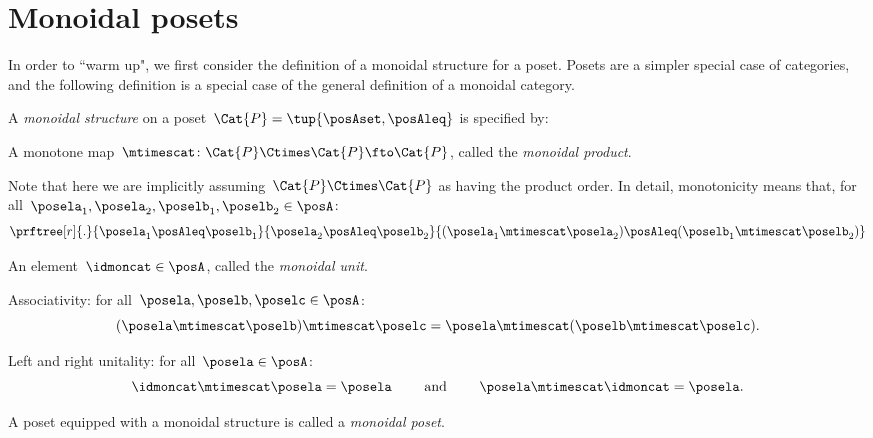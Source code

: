 
\section{Monoidal posets}


In order to ``warm up", we first consider the definition of a monoidal structure for a poset.
Posets are a simpler special case of categories, and the following definition is a special case of the general definition of a monoidal category.

\begin{ctdefinition}
    \label{def:monoidal-poset}
    A \emph{monoidal structure} on a poset~$\Cat{P} = \tup{\posAset, \posAleq}$ is specified by:

    \constit
    \begin{compactenum}
        \item A monotone map~$\mtimescat \colon \Cat{P} \Ctimes \Cat{P} \fto \Cat{P}$, called the \emph{monoidal product}.

              \noindent
              Note that here we are implicitly assuming~$\Cat{P} \Ctimes \Cat{P}$ as having the product order.
              In detail, monotonicity means that, for all~$\posela_1, \posela_2, \poselb_1, \poselb_2 \in \posA$:
              \begin{equation}
                  \prftree[r]{.
                  }
                  {\posela_1 \posAleq \poselb_1}{\posela_2 \posAleq \poselb_2}{ (\posela_1 \mtimescat  \posela_2) \posAleq  (\poselb_1 \mtimescat  \poselb_2)}
              \end{equation}
        \item An element~$\idmoncat \in \posA$, called the \emph{monoidal unit}.
    \end{compactenum}

    \condit
    \begin{compactenum}
        \item Associativity: for all~$\posela, \poselb, \poselc \in \posA$:
              \begin{equation}
                  (\posela \mtimescat \poselb)
                  \mtimescat \poselc =  \posela  \mtimescat ( \poselb \mtimescat \poselc).
              \end{equation}
        \item Left and right unitality: for all~$\posela \in \posA$:
              \begin{equation}
                  \idmoncat \mtimescat \posela = \posela \quad \quad \text{ and } \quad \quad \posela \mtimescat \idmoncat = \posela.
              \end{equation}
    \end{compactenum}

    \noindent A poset equipped with a monoidal structure is called a \emph{monoidal poset}.
\end{ctdefinition}

